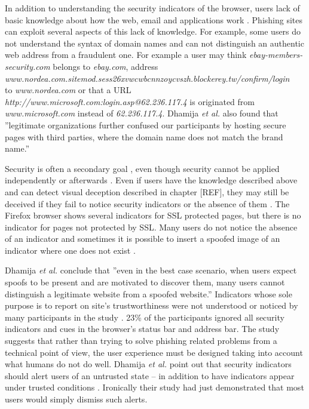 \documentclass{tktltiki}
\begin{document}
    In addition to understanding the security indicators of the browser, users lack of basic knowledge about how the web, email and applications work \cite{why_phishing_works_06}. Phishing sites can exploit several aspects of this lack of knowledge. For example, some users do not understand the syntax of domain names and can not distinguish an authentic web address from a fraudulent one. For example a user may think 
\emph{ebay-members-security.com} belongs to \emph{ebay.com}, address \\
\emph{www.nordea.com.sitemod.sess26xvwcwbcnnzoycvszh.blockerey.tw/confirm/login} \\
to \emph{www.nordea.com} or that a URL \emph{http://www.microsoft.com:login.asp@62.236.117.4}
is originated from \emph{www.microsoft.com} instead of \emph{62.236.117.4}. 
Dhamija \emph{et al.} \cite{why_phishing_works_06} also found that ''legitimate organizations further confused our participants by hosting secure pages with third parties, where the domain name does not match the brand name.''
        
    Security is often a secondary goal \cite{why_phishing_works_06}, even though security cannot be applied independently or afterwards \cite{schneier_secrets_and_lies_2000, lampson_distributed_1992}. Even if users have the knowledge described above and can detect visual deception described in chapter [REF], they may still be deceived if they fail to notice security indicators or the absence of them \cite{why_phishing_works_06}. The Firefox browser shows several indicators for SSL protected pages, but there is no indicator for pages not protected by SSL. Many users do not notice the absence of an indicator and sometimes it is possible to insert a spoofed image of an indicator where one does not exist \cite{why_phishing_works_06}.
        
    Dhamija \emph{et al.} conclude \cite{why_phishing_works_06} that ''even in the best case scenario, when users expect spoofs to be present and are motivated to discover them, many users cannot distinguish a legitimate website from a spoofed website.'' Indicators whose sole purpose is to report on site's trustworthiness were not understood or noticed by many participants in the study \cite{why_phishing_works_06}. 23\% of the participants ignored all security indicators and cues in the browser's status bar and address bar. The study suggests that rather than trying to solve phishing related problems from a technical point of view, the user experience must be designed taking into account what humans do not do well. Dhamija \emph{et al.} point out that security indicators should alert users of an untrusted state -- in addition to have indicators appear under trusted conditions \cite{why_phishing_works_06}. Ironically their study had just demonstrated that most users would simply dismiss such alerts.
        
\end{document}
